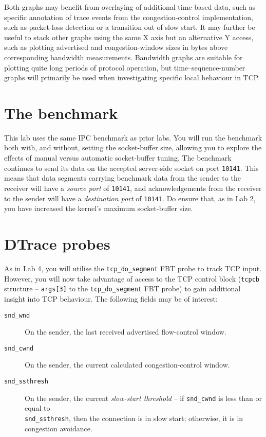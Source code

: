 \documentclass[a4paper,10pt]{article}
\begin{document}
Both graphs may benefit from overlaying of additional time-based data, such as
specific annotation of trace events from the congestion-control
implementation, such as packet-loss detection or a transition out of slow
start.
It may further be useful to stack other graphs using the same X axis but an
alternative Y access, such as plotting advertised and congestion-window sizes
in bytes above corresponding bandwidth measurements.
Bandwidth graphs are suitable for plotting quite long periods of protocol
operation, but time--sequence-number graphs will primarily be used when
investigating specific local behaviour in TCP.

\section*{The benchmark}

This lab uses the same IPC benchmark as prior labs.
You will run the benchmark both with, and without, setting the socket-buffer
size, allowing you to explore the effects of manual versus automatic
socket-buffer tuning.
The benchmark continues to send its data on the accepted server-side socket on
port \texttt{10141}.
This means that data segments carrying benchmark data from the sender to the
receiver will have a \textit{source port} of \texttt{10141}, and
acknowledgements from the receiver to the sender will have a
\textit{destination port} of \texttt{10141}.
Do ensure that, as in Lab 2, you have increased the kernel's maximum 
socket-buffer size.

\section*{DTrace probes}

As in Lab 4, you will utilise the \texttt{tcp\_do\_segment} FBT probe to track
TCP input.
However, you will now take advantage of access to the TCP control block
(\texttt{tcpcb} structure -- \texttt{args[3]} to the \texttt{tcp\_do\_segment}
FBT probe) to gain additional insight into TCP behaviour.
The following fields may be of interest:

\begin{description}
\item[\texttt{snd\_wnd}] On the sender, the last received advertised
  flow-control window.
\item[\texttt{snd\_cwnd}] On the sender, the current calculated
  congestion-control window.
\item[\texttt{snd\_ssthresh}] On the sender, the current \textit{slow-start
  threshold} -- if \texttt{snd\_cwnd} is less than or equal to \\
  \texttt{snd\_ssthresh},
  then the connection is in slow start; otherwise, it is in congestion
  avoidance.
\end{description}
\end{document}
